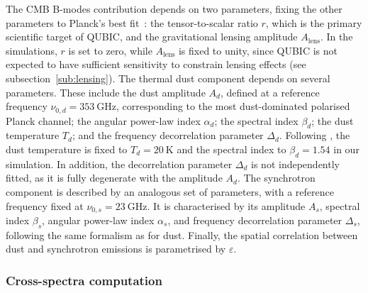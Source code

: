 \documentclass[../../thesis.tex]{subfiles}
\begin{document}
The CMB B-modes contribution depends on two parameters, fixing the other parameters to Planck's best fit~\cite{planck2018VI}: the tensor-to-scalar ratio $r$, which is the primary scientific target of QUBIC, and the gravitational lensing amplitude $A_{\mathrm{lens}}$. In the simulations, $r$ is set to zero, while $A_{\mathrm{lens}}$ is fixed to unity, since QUBIC is not expected to have sufficient sensitivity to constrain lensing effects (see subsection~\ref{sub:lensing}).
The thermal dust component depends on several parameters. These include the dust amplitude $A_d$, defined at a reference frequency $\nu_{0,d} = 353~\mathrm{GHz}$, corresponding to the most dust-dominated polarised Planck channel; the angular power-law index $\alpha_d$; the spectral index $\beta_d$; the dust temperature $T_d$; and the frequency decorrelation parameter $\Delta_d$. Following \cite{Planck2018XI}, the dust temperature is fixed to $T_d = 20~\mathrm{K}$ and the spectral index to $\beta_d = 1.54$ in our simulation. In addition, the decorrelation parameter $\Delta_d$ is not independently fitted, as it is fully degenerate with the amplitude $A_d$.
The synchrotron component is described by an analogous set of parameters, with a reference frequency fixed at $\nu_{0,s} = 23~\mathrm{GHz}$. It is characterised by its amplitude $A_s$, spectral index $\beta_s$, angular power-law index $\alpha_s$, and frequency decorrelation parameter $\Delta_s$, following the same formalism as for dust.
Finally, the spatial correlation between dust and synchrotron emissions is parametrised by $\varepsilon$.

\subsubsection{Cross-spectra computation}
\end{document}

